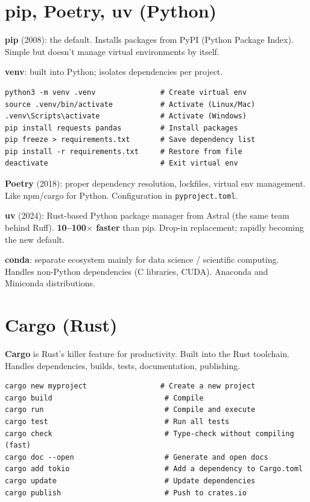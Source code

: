 \documentclass[11pt, letterpaper]{article}
\begin{document}
\section*{pip, Poetry, uv (Python)}

\textbf{pip} (2008): the default. Installs packages from PyPI (Python Package Index). Simple but doesn't manage virtual environments by itself.

\textbf{venv}: built into Python; isolates dependencies per project.

\begin{lstlisting}[style=code, caption={Standard Python workflow}]
python3 -m venv .venv               # Create virtual env
source .venv/bin/activate           # Activate (Linux/Mac)
.venv\Scripts\activate              # Activate (Windows)
pip install requests pandas         # Install packages
pip freeze > requirements.txt       # Save dependency list
pip install -r requirements.txt     # Restore from file
deactivate                          # Exit virtual env
\end{lstlisting}

\textbf{Poetry} (2018): proper dependency resolution, lockfiles, virtual env management. Like npm/cargo for Python. Configuration in \texttt{pyproject.toml}.

\textbf{uv} (2024): Rust-based Python package manager from Astral (the same team behind Ruff). \textbf{10--100$\times$ faster} than pip. Drop-in replacement; rapidly becoming the new default.

\textbf{conda}: separate ecosystem mainly for data science / scientific computing. Handles non-Python dependencies (C libraries, CUDA). Anaconda and Miniconda distributions.

\section*{Cargo (Rust)}

\textbf{Cargo} is Rust's killer feature for productivity. Built into the Rust toolchain. Handles dependencies, builds, tests, documentation, publishing.

\begin{lstlisting}[style=code, caption={Cargo basic commands}]
cargo new myproject                 # Create a new project
cargo build                          # Compile
cargo run                            # Compile and execute
cargo test                           # Run all tests
cargo check                          # Type-check without compiling (fast)
cargo doc --open                     # Generate and open docs
cargo add tokio                      # Add a dependency to Cargo.toml
cargo update                         # Update dependencies
cargo publish                        # Push to crates.io
\end{lstlisting}
\end{document}
